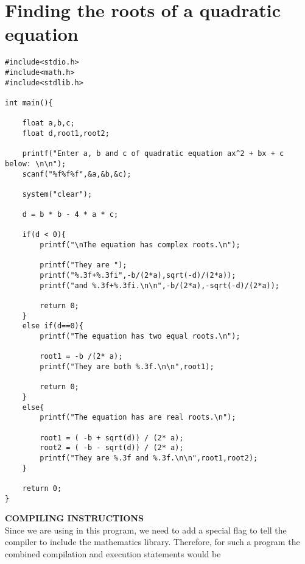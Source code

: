 \documentclass[11pt,oneside]{article}
\newcommand{\info}[1]{\textbf{\scriptsize{\sffamily\addfontfeatures{LetterSpace=7} #1\\[.35em]}}}
\begin{document}
\section{Finding the roots of a quadratic equation}
\begin{lstlisting}
#include<stdio.h>
#include<math.h>
#include<stdlib.h>

int main(){    

    float a,b,c;
    float d,root1,root2;
    
    printf("Enter a, b and c of quadratic equation ax^2 + bx + c below: \n\n");
    scanf("%f%f%f",&a,&b,&c);
    
    system("clear");
    
    d = b * b - 4 * a * c;
    
    if(d < 0){
        printf("\nThe equation has complex roots.\n");
        
        printf("They are ");
        printf("%.3f+%.3fi",-b/(2*a),sqrt(-d)/(2*a));
        printf("and %.3f+%.3fi.\n\n",-b/(2*a),-sqrt(-d)/(2*a));
        
        return 0;
    }
    else if(d==0){
        printf("The equation has two equal roots.\n");
        
        root1 = -b /(2* a);
        printf("They are both %.3f.\n\n",root1);
        
        return 0;
    }
    else{
        printf("The equation has are real roots.\n");
        
        root1 = ( -b + sqrt(d)) / (2* a);
        root2 = ( -b - sqrt(d)) / (2* a);
        printf("They are %.3f and %.3f.\n\n",root1,root2);
    }

    return 0;
}
\end{lstlisting}
\vspace{0.5cm}
\begin{infobox}
\info{\MakeUppercase{Compiling instructions}}
Since we are using  in this program, we need to add a special flag  to tell the compiler to include the mathematics library. Therefore, for such a program the combined compilation and execution statements would be 
\end{infobox}
\pagebreak
%
%
\end{document}
